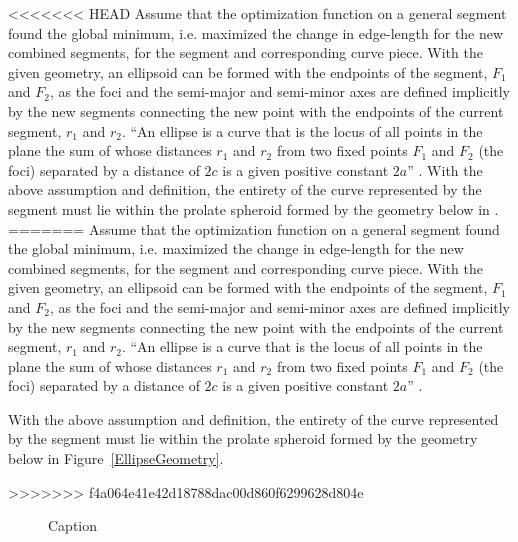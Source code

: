 <<<<<<< HEAD
Assume that the optimization function on a general segment found the global minimum, i.e. maximized the change in edge-length for the new combined segments, for the segment and corresponding curve piece.  With the given geometry, an ellipsoid can be formed with the endpoints of the segment, $F_1$ and $F_2$, as the foci and the semi-major and semi-minor axes are defined implicitly by the new segments connecting the new point with the endpoints of the current segment, $r_1$ and $r_2$.  ``An ellipse is a curve that is the locus of all points in the plane the sum of whose distances $r_1$ and $r_2$ from two fixed points $F_1$ and $F_2$ (the foci) separated by a distance of $2c$ is a given positive constant $2a$'' \cite{weissteine}.  With the above assumption and definition, the entirety of the curve represented by the segment must lie within the prolate spheroid  formed by the geometry below in .
=======
Assume that the optimization function on a general segment found the 
global minimum, i.e. maximized the change in edge-length for the new 
combined segments, for the segment and corresponding curve piece.  With 
the given geometry, an ellipsoid can be formed with the endpoints of the 
segment, $F_1$ and $F_2$, as the foci and the semi-major and semi-minor 
axes are defined implicitly by the new segments connecting the new point 
with the endpoints of the current segment, $r_1$ and $r_2$.  ``An ellipse 
is a curve that is the locus of all points in the plane the sum of whose 
distances $r_1$ and $r_2$ from two fixed points $F_1$ and $F_2$ (the foci) 
separated by a distance of $2c$ is a given positive constant $2a$'' 
\cite{weissteine}.

\begin{theorem}
With the above assumption and definition, the entirety of the curve 
represented by the segment must lie within the prolate spheroid  formed by the geometry below in Figure~\ref{EllipseGeometry}.
\end{theorem}
>>>>>>> f4a064e41e42d18788dac00d860f6299628d804e

\begin{figure}[h!]
  \caption{\label{ref:EllipseGeometry} Caption}
\end{figure}

